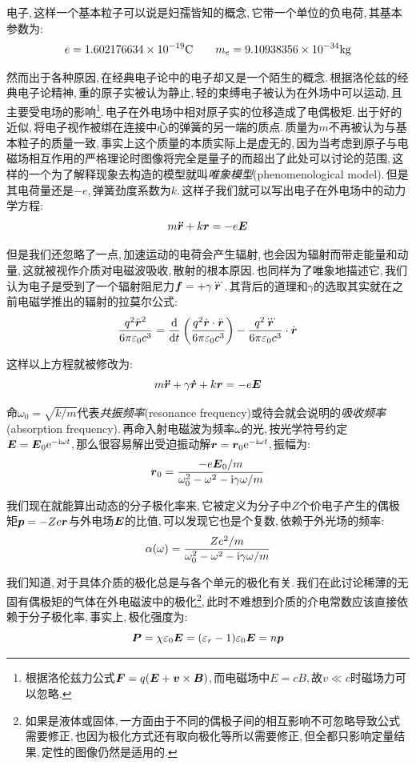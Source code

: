 电子,\,这样一个基本粒子可以说是妇孺皆知的概念,\,它带一个单位的负电荷,\,其基本参数为:
\[e=1.602176634\times 10^{-19}{\rm C}\qquad m_e=9.10938356\times 10^{-34}{\rm kg}\]

然而出于各种原因,\,在经典电子论中的电子却又是一个陌生的概念.\,根据洛伦兹的经典电子论精神,\,重的原子实被认为静止,\,轻的束缚电子被认为在外场中可以运动,\,且主要受电场的影响\footnote{根据洛伦兹力公式$\boldsymbol{F}=q(\boldsymbol{E}+\boldsymbol{v}\times\boldsymbol{B})$,\,而电磁场中$E=cB$,\,故$v\ll c$时磁场力可以忽略.}.\,电子在外电场中相对原子实的位移造成了电偶极矩.\,出于好的近似,\,将电子视作被绑在连接中心的弹簧的另一端的质点.\,质量为$m$不再被认为与基本粒子的质量一致,\,事实上这个质量的本质实际上是虚无的,\,因为当考虑到原子与电磁场相互作用的严格理论时图像将完全是量子的而超出了此处可以讨论的范围,\,这样的一个为了解释现象去构造的模型就叫\emph{唯象模型}(phenomenological model).\,但是其电荷量还是$-e$,\,弹簧劲度系数为$k$.\,这样子我们就可以写出电子在外电场中的动力学方程:
\[m\boldsymbol{\ddot{r}}+k\boldsymbol{r}=-e\boldsymbol{E}\]

但是我们还忽略了一点,\,加速运动的电荷会产生辐射,\,也会因为辐射而带走能量和动量,\,这就被视作介质对电磁波吸收,\,散射的根本原因.\,也同样为了唯象地描述它,\,我们认为电子是受到了一个辐射阻尼力$\boldsymbol{f}=+\gamma \dddot{\boldsymbol{r}}$.\,其背后的道理和$\gamma$的选取其实就在之前电磁学推出的辐射的拉莫尔公式:
\[\frac{q^2\ddot{\boldsymbol{r}}^2}{6\pi\varepsilon_0c^3}=\frac{\textrm{d} }{\textrm{d} t}\left(\frac{q^2\dot{\boldsymbol{r}}\cdot \ddot{\boldsymbol{r}}}{6\pi\varepsilon_0c^3}\right)-\frac{q^2\dddot{\boldsymbol{r}}}{6\pi\varepsilon_0c^3}\cdot \dot{\boldsymbol{r}}\]

这样以上方程就被修改为:
\[m\boldsymbol{\ddot{r}}+\gamma \boldsymbol{\dot{r}}+k\boldsymbol{r}=-e\boldsymbol{E}\]

命$\omega_0=\sqrt{k/m}$代表\emph{共振频率}(resonance frequency)或待会就会说明的\emph{吸收频率}(absorption frequency).\,再命入射电磁波为频率$\omega$的光,\,按光学符号约定$\boldsymbol{E}=\boldsymbol{E}_0{\rm e}^{-{\rm i}\omega t}$,\,那么很容易解出受迫振动解$\boldsymbol{r}=\boldsymbol{r}_0{\rm e}^{-{\rm i}\omega t}$,\,振幅为:
\[\boldsymbol{r}_0=\frac{-e\boldsymbol{E}_0/m}{\omega_0^2-\omega^2-{\rm i}\gamma\omega/m}\]

我们现在就能算出动态的分子极化率来,\,它被定义为分子中$Z$个价电子产生的偶极矩$\boldsymbol{p}=-Ze\boldsymbol{r}$与外电场$\boldsymbol{E}$的比值,\,可以发现它也是个复数,\,依赖于外光场的频率:
\[\alpha(\omega)=\frac{Ze^2/m}{\omega_0^2-\omega^2-{\rm i}\gamma\omega/m}\]

我们知道,\,对于具体介质的极化总是与各个单元的极化有关.\,我们在此讨论稀薄的无固有偶极矩的气体在外电磁波中的极化\footnote{如果是液体或固体,\,一方面由于不同的偶极子间的相互影响不可忽略导致公式需要修正,\,也因为极化方式还有取向极化等所以需要修正,\,但全都只影响定量结果,\,定性的图像仍然是适用的.},\,此时不难想到介质的介电常数应该直接依赖于分子极化率,\,事实上,\,极化强度为:
\[\boldsymbol{P}=\chi\varepsilon_0\boldsymbol{E}=(\varepsilon_r-1)\varepsilon_0\boldsymbol{E}=n\boldsymbol{p}\]



